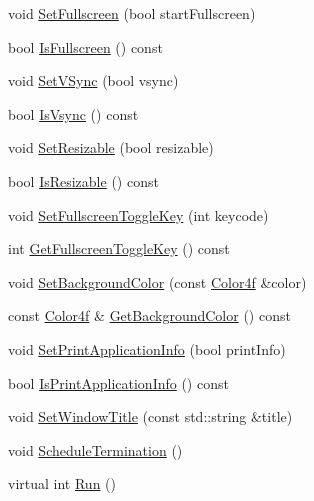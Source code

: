 \begin{DoxyCompactItemize}
\item 
void \hyperlink{classastu_1_1InteractiveApplication_a0d4bf3ae685c87a9205f6d02d3ab167d}{Set\+Fullscreen} (bool start\+Fullscreen)
\item 
bool \hyperlink{classastu_1_1InteractiveApplication_a3f8e72fa951185e7b91508770c84f12c}{Is\+Fullscreen} () const
\item 
void \hyperlink{classastu_1_1InteractiveApplication_aead5e69def1c1152a6cd1bce96e74077}{Set\+V\+Sync} (bool vsync)
\item 
bool \hyperlink{classastu_1_1InteractiveApplication_afd105e1fc78f2f7e61da9b3e7a13fce0}{Is\+Vsync} () const
\item 
void \hyperlink{classastu_1_1InteractiveApplication_abc17507b3921d5dbc0b5c1648d0b1019}{Set\+Resizable} (bool resizable)
\item 
bool \hyperlink{classastu_1_1InteractiveApplication_a66bceb4413315cc27216e11d6198143d}{Is\+Resizable} () const
\item 
void \hyperlink{classastu_1_1InteractiveApplication_a3708c8d8673411cdb973e690f052e6e7}{Set\+Fullscreen\+Toggle\+Key} (int keycode)
\item 
int \hyperlink{classastu_1_1InteractiveApplication_a1e9a970c88bd969f567b4e02516ebbb2}{Get\+Fullscreen\+Toggle\+Key} () const
\item 
void \hyperlink{classastu_1_1InteractiveApplication_ad5851eac16a92c2fba90ea369ee9ec2e}{Set\+Background\+Color} (const \hyperlink{classastu_1_1Color}{Color4f} \&color)
\item 
const \hyperlink{classastu_1_1Color}{Color4f} \& \hyperlink{classastu_1_1InteractiveApplication_ad3d7a6635542108268e0ff7b8062fda8}{Get\+Background\+Color} () const
\item 
void \hyperlink{classastu_1_1InteractiveApplication_ad79ee560819ffa161870b8dfcb5a0113}{Set\+Print\+Application\+Info} (bool print\+Info)
\item 
bool \hyperlink{classastu_1_1InteractiveApplication_aab39a60ab9b275d43c54647c0914f9b4}{Is\+Print\+Application\+Info} () const
\item 
void \hyperlink{classastu_1_1InteractiveApplication_a8964c8cb3ae5c445023cc2cc0caefe7a}{Set\+Window\+Title} (const std\+::string \&title)
\item 
void \hyperlink{classastu_1_1InteractiveApplication_a0dbdefcecfef7b08dae2ea10b2a05435}{Schedule\+Termination} ()
\item 
virtual int \hyperlink{classastu_1_1InteractiveApplication_abbe4eab09f255951ecf21e85764f2ada}{Run} ()
\end{DoxyCompactItemize}
